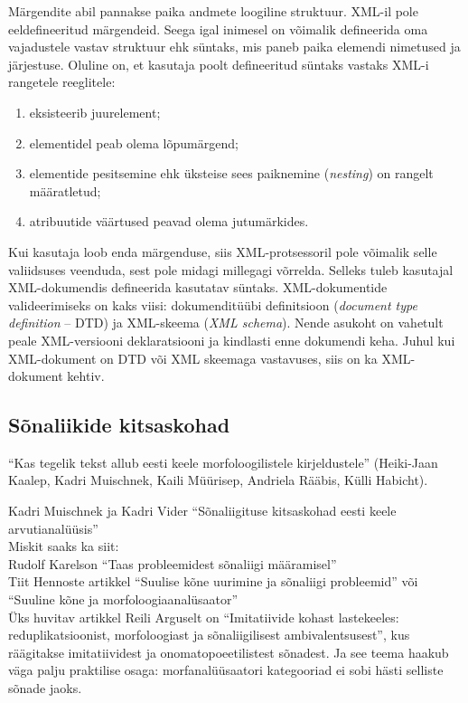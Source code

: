 \documentclass[12pt]{article}
\begin{document}
Märgendite abil pannakse paika andmete loogiline struktuur. XML-il pole eeldefineeritud märgendeid. Seega igal inimesel on võimalik defineerida oma vajadustele vastav struktuur ehk süntaks, mis paneb paika elemendi nimetused ja järjestuse. Oluline on, et kasutaja poolt defineeritud süntaks vastaks XML-i rangetele reeglitele:

\begin{enumerate}
    \item eksisteerib juurelement;
    \item elementidel peab olema lõpumärgend;
    \item elementide pesitsemine ehk üksteise sees paiknemine (\emph{nesting}) on rangelt määratletud;
    \item atribuutide väärtused peavad olema jutumärkides.
    \citep{XML}
\end{enumerate}

Kui kasutaja loob enda märgenduse, siis XML-protsessoril pole võimalik selle valiidsuses veenduda, sest pole midagi millegagi võrrelda. Selleks tuleb kasutajal XML-dokumendis defineerida kasutatav süntaks. XML-dokumentide valideerimiseks on kaks viisi: dokumenditüübi definitsioon (\emph{document type definition} -- DTD) ja XML-skeema (\emph{XML schema}). Nende asukoht on vahetult peale XML-versiooni deklaratsiooni ja kindlasti enne dokumendi keha. Juhul kui XML-dokument on DTD või XML skeemaga vastavuses, siis on ka XML-dokument kehtiv. \citep{XML}

\subsection{Sõnaliikide kitsaskohad}

``Kas tegelik tekst allub eesti keele morfoloogilistele kirjeldustele'' (Heiki-Jaan Kaalep, Kadri Muischnek, Kaili Müürisep, Andriela Rääbis, Külli Habicht).

Kadri Muischnek ja Kadri Vider ``Sõnaliigituse kitsaskohad eesti keele arvutianalüüsis''\\
Miskit saaks ka siit:\\
Rudolf Karelson ``Taas probleemidest sõnaliigi määramisel''\\
Tiit Hennoste artikkel ``Suulise kõne uurimine ja sõnaliigi probleemid'' või ``Suuline kõne ja morfoloogiaanalüsaator''\\ 

Üks huvitav artikkel Reili Arguselt on ``Imitatiivide kohast lastekeeles: reduplikatsioonist, morfoloogiast ja sõnaliigilisest ambivalentsusest'', kus räägitakse imitatiividest ja onomatopoeetilistest sõnadest. Ja see teema haakub väga palju praktilise osaga: morfanalüüsaatori kategooriad ei sobi hästi selliste sõnade jaoks.
\end{document}
